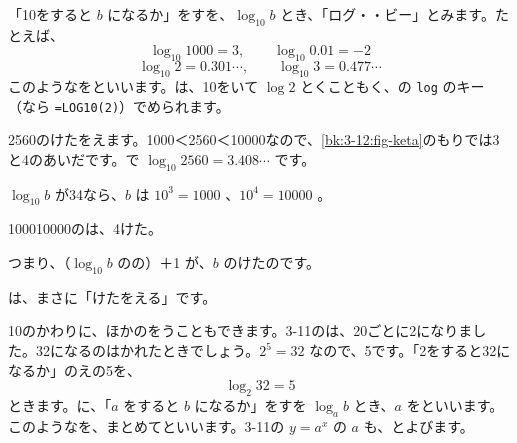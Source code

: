 「10をすると $b$ になるか」をすを、$\log_{10}b$ とき、「ログ・・ビー」とみます。たとえば、
\[ \log_{10}1000=3,\qquad \log_{10}0.01=-2 \]
\[ \log_{10}2=0.301\cdots,\qquad \log_{10}3=0.477\cdots \]
このようなを\textbf{}といいます。は、10をいて $\log2$ とくこともく、の \texttt{log} のキー（なら \texttt{=LOG10(2)}）でめられます。

2560のけたをえます。1000＜2560＜10000なので、\ref{bk:3-12:fig-keta}のもりでは3と4のあいだです。で $\log_{10}2560=3.408\cdots$ です。
\begin{enumerate}[label={\bkcircled[bkTheme]{\arabic*}}, leftmargin=2.4\zw, itemsep=1pt, topsep=2pt]
\item $\log_{10}b$ が34なら、$b$ は $10^3=1000$ 、$10^4=10000$ 。
\item 100010000のは、4けた。
\item つまり、（$\log_{10}b$ のの）＋1 が、$b$ のけたのです。
\end{enumerate}
は、まさに「けたをえる」です。


\leavevmode\label{bk:3-12:log}10のかわりに、ほかのをうこともできます。3-11のは、20ごとに2になりました。32になるのはかれたときでしょう。$2^5=32$ なので、5です。「2をすると32になるか」のえの5を、
\[ \log_2 32=5 \]
ときます。に、「$a$ をすると $b$ になるか」をすを $\log_ab$ とき、$a$ を\textbf{}といいます。このようなを、まとめて\textbf{}といいます。3-11の $y=a^x$ の $a$ も、とよびます。

